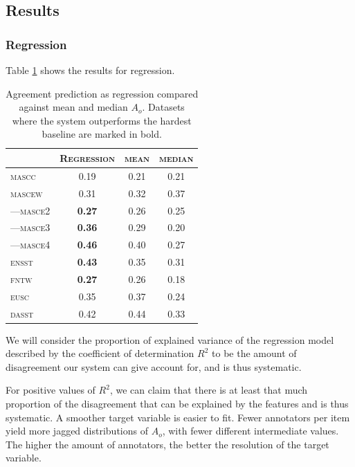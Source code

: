 \documentclass[11pt,a4paper]{article}
\begin{document}
\subsection{Results}
\subsubsection{Regression}

Table \ref{tab:regagr_results} shows the results for regression.


\begin{table}[Ht!]

\begin{center}
  \begin{tabular}{lc|cc}
 \toprule
 & \textsc{Regression} & \textsc{mean} & \textsc{median} \\
 \midrule
 \textsc{mascc} & 0.19 & 0.21 & 0.21 \\
 \textsc{mascew} & 0.31 & 0.32 & 0.37 \\
---\textsc{masce2} & \textbf{0.27} & 0.26 & 0.25 \\
---\textsc{masce3} &\textbf{ 0.36} & 0.29 & 0.20 \\
---\textsc{masce4} & \textbf{0.46} & 0.40 & 0.27 \\
\textsc{ensst} & \textbf{0.43} & 0.35 & 0.31 \\
\textsc{fntw} & \textbf{0.27} & 0.26 & 0.18 \\

\textsc{eusc} & 0.35 & 0.37 & 0.24 \\
\textsc{dasst} & 0.42 & 0.44 & 0.33 \\

\bottomrule

  \end{tabular}  
\end{center}
\caption{Agreement prediction as regression compared against mean and median $A_o$. Datasets where the system outperforms the hardest baseline are marked in bold. \label{tab:regagr_results}}
\end{table} 

We will consider the proportion of explained variance of the regression model described by the coefficient of determination $R^2$ to be the amount of disagreement our system can give account for, and is thus systematic. 


For positive values of $R^2$, we can claim that there is at least that much proportion of the disagreement that can be explained by the features and is thus systematic. A smoother target variable is easier to fit. Fewer annotators per item yield more jagged distributions of $A_o$, with fewer different intermediate values. The higher the amount of annotators, the better the resolution of the target variable. 
\end{document}
